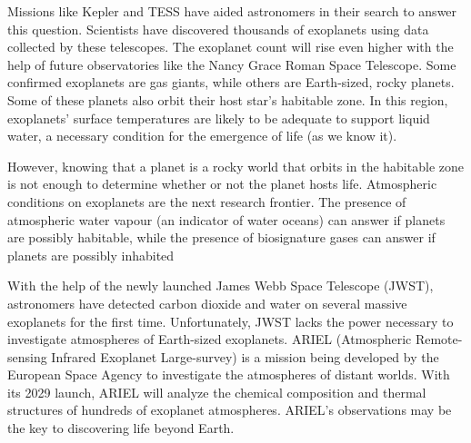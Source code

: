 Missions like Kepler and TESS have aided astronomers in their search to answer this question. Scientists have discovered thousands of exoplanets using data collected by these telescopes.
The exoplanet count will rise even higher with the help of future observatories like the Nancy Grace Roman Space Telescope.
Some confirmed exoplanets are gas giants, while others are Earth-sized, rocky planets. 
Some of these planets also orbit their host star’s habitable zone.
In this region, exoplanets' surface temperatures are likely to be adequate to support liquid water, a necessary condition for the emergence of life (as we know it).

However, knowing that a planet is a rocky world that orbits in the habitable zone is not enough to determine whether or not the planet hosts life.
Atmospheric conditions on exoplanets are the next research frontier.
The presence of atmospheric water vapour (an indicator of water oceans) can answer if planets are possibly habitable, while the presence of biosignature gases can answer if planets are possibly inhabited

With the help of the newly launched James Webb Space Telescope (JWST), astronomers have detected carbon dioxide and water on several massive exoplanets for the first time.
Unfortunately, JWST lacks the power necessary to investigate atmospheres of Earth-sized exoplanets.
ARIEL (Atmospheric Remote-sensing Infrared Exoplanet Large-survey) is a mission being developed by the European Space Agency to investigate the atmospheres of distant worlds.
With its 2029 launch, ARIEL will analyze the chemical composition and thermal structures of hundreds of exoplanet atmospheres.
ARIEL's observations may be the key to discovering life beyond Earth.

